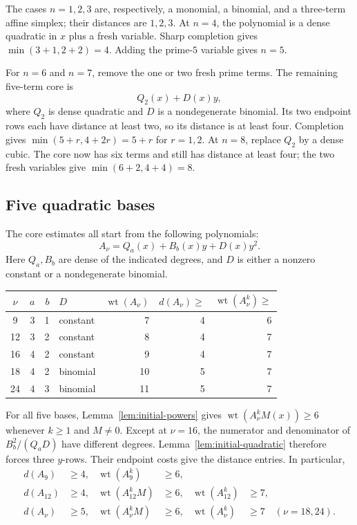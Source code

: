 \documentclass[11pt]{article}
\DeclareMathOperator{\wt}{wt}\DeclareMathOperator{\ord}{ord}
\numberwithin{equation}{section}
\theoremstyle{definition}\newtheorem{definition}[theorem]{Definition}
\theoremstyle{remark}\newtheorem{remark}[theorem]{Remark}
\begin{document}
The cases $n=1,2,3$ are, respectively, a monomial, a binomial, and a
three-term affine simplex; their distances are $1,2,3$.  At $n=4$, the
polynomial is a dense quadratic in $x$ plus a fresh variable.  Sharp
completion gives $\min(3+1,2+2)=4$.  Adding the prime-$5$ variable gives
$n=5$.

For $n=6$ and $n=7$, remove the one or two fresh prime terms.  The
remaining five-term core is
\[
 Q_2(x)+D(x)y,
\]
where $Q_2$ is dense quadratic and $D$ is a nondegenerate binomial.
Its two endpoint rows each have distance at least two, so its distance
is at least four.  Completion gives
$\min(5+r,4+2r)=5+r$ for $r=1,2$.
At $n=8$, replace $Q_2$ by a dense cubic.  The core now has six terms
and still has distance at least four; the two fresh variables give
$\min(6+2,4+4)=8$.

\subsection{Five quadratic bases}

The core estimates all start from the following polynomials:
\[
 A_\nu=Q_a(x)+B_b(x)y+D(x)y^2.
\]
Here $Q_a,B_b$ are dense of the indicated degrees, and $D$ is either a
nonzero constant or a nondegenerate binomial.
\begin{center}
\begin{tabular}{c|rrl|rrr}
\toprule
$\nu$&$a$&$b$&$D$&$\wt(A_\nu)$&$d(A_\nu)\ge$&$\wt(A_\nu^k)\ge$\\\midrule
9&3&1&constant&7&4&6\\
12&3&2&constant&8&4&7\\
16&4&2&constant&9&4&7\\
18&4&2&binomial&10&5&7\\
24&4&3&binomial&11&5&7\\
\bottomrule
\end{tabular}
\end{center}
For all five bases, Lemma~\ref{lem:initial-powers} gives
$\wt(A_\nu^kM(x))\ge6$ whenever $k\ge1$ and $M\ne0$.
Except at $\nu=16$, the numerator and denominator of $B_b^2/(Q_aD)$
have different degrees. Lemma~\ref{lem:initial-quadratic} therefore
forces three $y$-rows. Their endpoint costs give the distance entries.
In particular,
\begin{align}
 d(A_9)&\ge4,&\wt(A_9^k)&\ge6,\label{eq:initial-nine-core}\\
 d(A_{12})&\ge4,&\wt(A_{12}^kM)&\ge6,&
 \wt(A_{12}^k)&\ge7,\label{eq:initial-twelve-A}\\
 d(A_\nu)&\ge5,&\wt(A_\nu^kM)&\ge6,&
 \wt(A_\nu^k)&\ge7\quad(\nu=18,24).
 \label{eq:initial-late-A}
\end{align}
\end{document}
